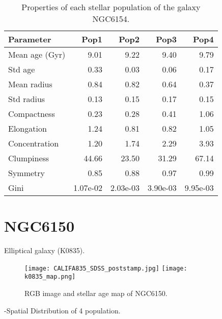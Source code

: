 \begin{table}[h]
\centering
\begin{tabular}{l|r|r|r|r}
Parameter & Pop1 & Pop2 & Pop3 & Pop4 \\\hline
Mean age (Gyr) & 9.01 & 9.22 & 9.40 & 9.79 \\
Std age & 0.33 & 0.03 & 0.06 & 0.17 \\
Mean radius & 0.84 & 0.82 & 0.64 & 0.37 \\
Std radius & 0.13 & 0.15 & 0.17 & 0.15 \\
Compactness & 0.23 & 0.28 & 0.41 & 1.06 \\
Elongation & 1.24 & 0.81 & 0.82 & 1.05 \\
Concentration & 1.20 & 1.74 & 2.29 & 3.93 \\
Clumpiness & 44.66 & 23.50 & 31.29 & 67.14 \\
Symmetry & 0.85 & 0.88 & 0.97 & 0.99 \\
Gini & 1.07e-02 & 2.03e-03 & 3.90e-03 & 9.95e-03 \\
\end{tabular}
\caption{\label{tab:widgets}Properties of each stellar population of the galaxy NGC6154.}
\end{table}



\newpage
\section*{NGC6150}
Elliptical galaxy (K0835).

\begin{figure}[bh]
\begin{center}
\texttt{[image: CALIFA835\_SDSS\_poststamp.jpg]}
\texttt{[image: k0835\_map.png]}
\caption{RGB image and stellar age map of NGC6150.}
   \label{fig1}
\end{center}
\end{figure}

-Spatial Distribution of 4 population.


